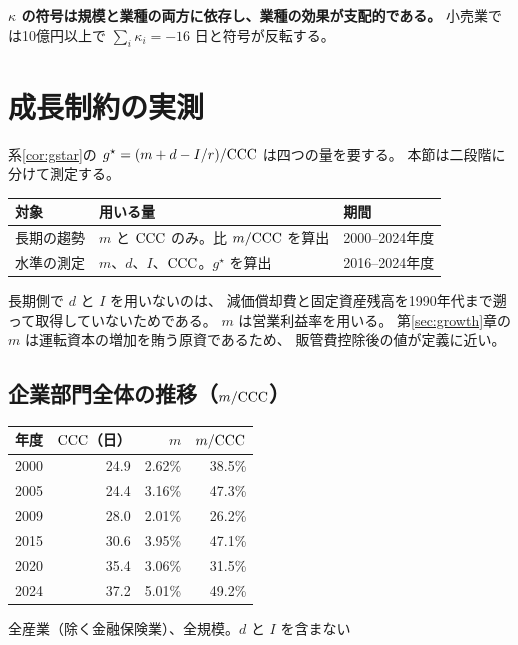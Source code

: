 \textbf{$\kappa$ の符号は規模と業種の両方に依存し、業種の効果が支配的である。}
小売業では10億円以上で $\sum_i\kappa_i = -16$ 日と符号が反転する。

\section{成長制約の実測}
\label{sec:gstar-measured}

系\ref{cor:gstar}の $g^\star=(m+d-I/r)/\mathrm{CCC}$ は四つの量を要する。
本節は二段階に分けて測定する。

\begin{center}
\begin{tabularx}{\textwidth}{@{}lXl@{}}
\toprule
対象 & 用いる量 & 期間 \\
\midrule
長期の趨勢 & $m$ と $\mathrm{CCC}$ のみ。比 $m/\mathrm{CCC}$ を算出 & 2000--2024年度 \\
水準の測定 & $m$、$d$、$I$、$\mathrm{CCC}$。$g^\star$ を算出 & 2016--2024年度 \\
\bottomrule
\end{tabularx}
\label{tab:gstar-measurement-stages}
\end{center}

長期側で $d$ と $I$ を用いないのは、
減価償却費と固定資産残高を1990年代まで遡って取得していないためである。
$m$ は営業利益率を用いる。
第\ref{sec:growth}章の $m$ は運転資本の増加を賄う原資であるため、
販管費控除後の値が定義に近い。

\subsection{企業部門全体の推移（$m/\mathrm{CCC}$）}

\begin{center}
\begin{tabular}{@{}rrrr@{}}
\toprule
年度 & $\mathrm{CCC}$（日） & $m$ & $m/\mathrm{CCC}$ \\
\midrule
2000 & 24.9 & 2.62\% & 38.5\% \\
2005 & 24.4 & 3.16\% & 47.3\% \\
2009 & 28.0 & 2.01\% & 26.2\% \\
2015 & 30.6 & 3.95\% & 47.1\% \\
2020 & 35.4 & 3.06\% & 31.5\% \\
2024 & 37.2 & 5.01\% & 49.2\% \\
\bottomrule
\end{tabular}
\label{tab:mccc-trend}
\end{center}
\begin{center}\footnotesize 全産業（除く金融保険業）、全規模。$d$ と $I$ を含まない\end{center}

